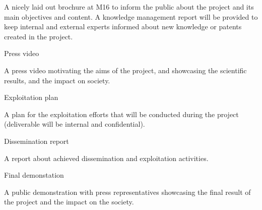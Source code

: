 {\begin{deliverables}{\WPInnovationNo}
A nicely laid out brochure at M16 to inform the public about the project and its main objectives and content. 
A knowledge management report will be provided to keep internal and external experts informed about new knowledge or patents created in the project.  

\item Press video
  \label{del:wpinnovation:pressvideo}
  \delresponsible{\IBM}

  A press video motivating the aims of the project, and showcasing the scientific results, and the impact on society.

\item Exploitation plan
  \label{del:wpinnovation:expplan}
  \delresponsible{\IBM}

 A plan for the exploitation efforts that will be conducted during the project (deliverable will be internal and confidential). 

\item Dissemination report
  \label{del:wpinnovation:dissemination}
	\delresponsible{\PRAGUE}

 A report about achieved dissemination and exploitation activities.

\item Final demonstation
  \label{del:wpinnovation:demo}
  \delresponsible{\VW}

 A public demonstration with press representatives showcasing the final result of the project and the impact on the society. 


\end{deliverables}

}


